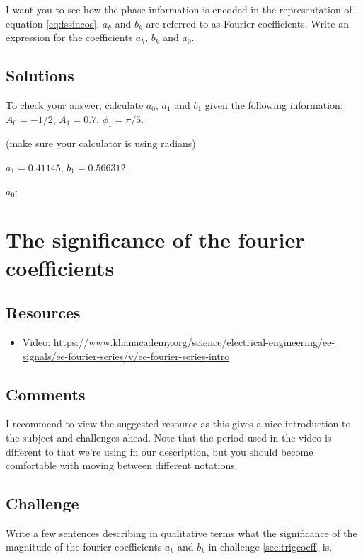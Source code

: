 I want you to see how the phase information is encoded in the representation of equation \ref{eq:fssincos}. $a_k$ and $b_k$ are referred to as Fourier coefficients. Write an expression for the coefficients $a_k$, $b_k$ and $a_0$.

\subsection*{Solutions}
To check your answer, calculate $a_0$, $a_1$ and $b_1$ given the following information:\\
$A_0=-1/2$, $A_1 = 0.7$, $\phi_1 = \pi/5$.

(make sure your calculator is using radians)

$a_1 = 0.41145$, $b_1 = 0.566312$.

$a_0$:




\newpage

\section{The significance of the fourier coefficients}

\subsection*{Resources}
\begin{itemize}
    \item Video: \url{https://www.khanacademy.org/science/electrical-engineering/ee-signals/ee-fourier-series/v/ee-fourier-series-intro}
\end{itemize}

\subsection*{Comments}
I recommend to view the suggested resource as this gives a nice introduction to the subject and challenges ahead. Note that the period used in the video is different to that we're using in our description, but you should become comfortable with moving between different notations.

\subsection*{Challenge}
Write a few sentences describing in qualitative terms what the significance of the magnitude of the fourier coefficients $a_k$ and $b_k$ in challenge \ref{sec:trigcoeff} is.

